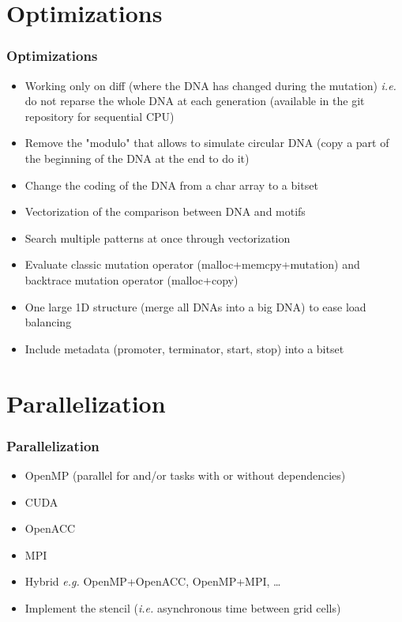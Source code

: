 \documentclass{beamer}
\begin{document}
\section{Optimizations}
\begin{frame}
 \frametitle{Optimizations}
 \begin{itemize}
  \item Working only on diff (where the DNA has changed during the mutation) \textit{i.e.} do not reparse the whole DNA at each generation (available in the git repository for sequential CPU)
  \item Remove the "modulo" that allows to simulate circular DNA (copy a part of the beginning of the DNA at the end to do it)
  \item Change the coding of the DNA from a char array to a bitset
  \item Vectorization of the comparison between DNA and motifs
  \item Search multiple patterns at once through vectorization
  \item Evaluate classic mutation operator (malloc+memcpy+mutation) and backtrace mutation operator (malloc+copy)
  \item One large 1D structure (merge all DNAs into a big DNA) to ease load balancing
  \item Include metadata (promoter, terminator, start, stop) into a bitset
 \end{itemize}
\end{frame}

\section{Parallelization}
\begin{frame}
 \frametitle{Parallelization}
 \begin{itemize}
  \item OpenMP (parallel for and/or tasks with or without dependencies)
  \item CUDA
  \item OpenACC
  \item MPI
  \item Hybrid \textit{e.g.} OpenMP+OpenACC, OpenMP+MPI, \ldots
  \vfill
  \item Implement the stencil (\textit{i.e.} asynchronous time between grid cells)
 \end{itemize}
\end{frame}
\end{document}
